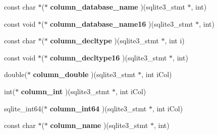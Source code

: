 \begin{DoxyCompactItemize}
\item 
const char $\ast$($\ast$ {\bfseries column\+\_\+database\+\_\+name} )(sqlite3\+\_\+stmt $\ast$, int)\hypertarget{structsqlite3__api__routines_a7b8e1de81b22244eab04e90ebed49bf5}{}\label{structsqlite3__api__routines_a7b8e1de81b22244eab04e90ebed49bf5}

\item 
const void $\ast$($\ast$ {\bfseries column\+\_\+database\+\_\+name16} )(sqlite3\+\_\+stmt $\ast$, int)\hypertarget{structsqlite3__api__routines_af8e642aae1dd0f81828eaa7759791fe9}{}\label{structsqlite3__api__routines_af8e642aae1dd0f81828eaa7759791fe9}

\item 
const char $\ast$($\ast$ {\bfseries column\+\_\+decltype} )(sqlite3\+\_\+stmt $\ast$, int i)\hypertarget{structsqlite3__api__routines_aad9e3c9907f96de1d4db36839e98ec01}{}\label{structsqlite3__api__routines_aad9e3c9907f96de1d4db36839e98ec01}

\item 
const void $\ast$($\ast$ {\bfseries column\+\_\+decltype16} )(sqlite3\+\_\+stmt $\ast$, int)\hypertarget{structsqlite3__api__routines_aa0c2e3c8ba3face8a9ca7825fa2abac1}{}\label{structsqlite3__api__routines_aa0c2e3c8ba3face8a9ca7825fa2abac1}

\item 
double($\ast$ {\bfseries column\+\_\+double} )(sqlite3\+\_\+stmt $\ast$, int i\+Col)\hypertarget{structsqlite3__api__routines_afd21003df28cb46354c00599b90e6de5}{}\label{structsqlite3__api__routines_afd21003df28cb46354c00599b90e6de5}

\item 
int($\ast$ {\bfseries column\+\_\+int} )(sqlite3\+\_\+stmt $\ast$, int i\+Col)\hypertarget{structsqlite3__api__routines_a6211d95cf114f26cb48eed02d3b5eb70}{}\label{structsqlite3__api__routines_a6211d95cf114f26cb48eed02d3b5eb70}

\item 
sqlite\+\_\+int64($\ast$ {\bfseries column\+\_\+int64} )(sqlite3\+\_\+stmt $\ast$, int i\+Col)\hypertarget{structsqlite3__api__routines_a523a8d125fe83c9ea45eb4057a4d2458}{}\label{structsqlite3__api__routines_a523a8d125fe83c9ea45eb4057a4d2458}

\item 
const char $\ast$($\ast$ {\bfseries column\+\_\+name} )(sqlite3\+\_\+stmt $\ast$, int)\hypertarget{structsqlite3__api__routines_ab01499e4ca8ec6db92f34f8274041ae5}{}\label{structsqlite3__api__routines_ab01499e4ca8ec6db92f34f8274041ae5}


\end{DoxyCompactItemize}
